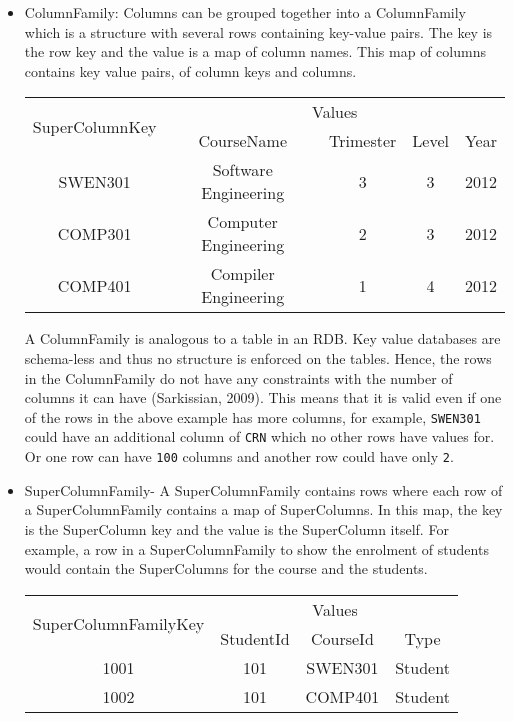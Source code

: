 \begin{itemize}
\item ColumnFamily: Columns can be grouped together into a ColumnFamily which is
a structure with several rows containing key-value pairs. The key is the row key
and the value is a map of column names. This map of columns contains key value
pairs, of column keys and columns.

\begin{table}[h]
	\centering
	\begin{tabular}{ c c c c c }
		\toprule
		\multirow{2}{*}{SuperColumnKey} & \multicolumn{4}{c}{Values}\\

		& CourseName & Trimester & Level & Year\\ 
		\midrule
		SWEN301 & Software Engineering & 3 & 3 & 2012\\
		COMP301 & Computer Engineering & 2 & 3 & 2012\\
		COMP401 & Compiler Engineering & 1 & 4 & 2012\\
		\bottomrule
	\end{tabular}
\end{table}
A ColumnFamily is analogous to a table in an \ac{RDB}. Key value databases are
schema-less and thus no structure is enforced on the tables. Hence, the rows in
the ColumnFamily do not have any constraints with the number of columns it can
have (Sarkissian, 2009). This means that it is valid even if one of the rows in
the above example has more columns, for example, \texttt{SWEN301} could have an
additional column of \texttt{CRN} which no other rows have values for. Or
one row can have \texttt{100} columns and another row could have only \texttt{2}.

\item SuperColumnFamily- A SuperColumnFamily contains rows where each row of a
SuperColumnFamily contains a map of SuperColumns. In this map, the key is the
SuperColumn key and the value is the SuperColumn itself. For example, a row in a
SuperColumnFamily to show the enrolment of students would contain the
SuperColumns for the course and the students.

\begin{table}[h]
	\centering
	\begin{tabular}{ c c c c }
		\toprule
		\multirow{2}{*}{SuperColumnFamilyKey} & \multicolumn{3}{c}{Values}\\
		& StudentId & CourseId & Type \\ 
		\midrule
		1001 & 101 & SWEN301 & Student \\
		1002 & 101 & COMP401 & Student \\
		\bottomrule
	\end{tabular}
\end{table}


\end{itemize}
